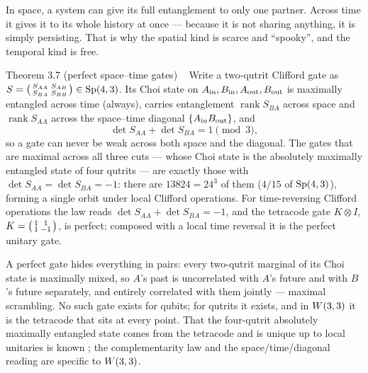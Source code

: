 \begin{plainwords}
In space, a system can give its full entanglement to only one partner. Across time it gives it to its whole history at
once --- because it is not sharing anything, it is simply persisting. That is why the spatial kind is scarce and
``spooky'', and the temporal kind is free.
\end{plainwords}

\begin{result}{Theorem 3.7 (perfect space--time gates) \hfill \tierT\ \tierC}
Write a two-qutrit Clifford gate as $S=\begin{psmallmatrix}S_{AA}&S_{AB}\\S_{BA}&S_{BB}\end{psmallmatrix}\in\mathrm{Sp}(4,3)$.
Its Choi state on $A_{\rm in},B_{\rm in},A_{\rm out},B_{\rm out}$ is maximally entangled across time (always), carries
entanglement $\operatorname{rank}S_{BA}$ across space and $\operatorname{rank}S_{AA}$ across the space--time diagonal
$\{A_{\rm in}B_{\rm out}\}$, and
\[
\det S_{AA}+\det S_{BA}=1 \pmod 3 ,
\]
so a gate can never be weak across both space and the diagonal. The gates that are maximal across all three cuts ---
whose Choi state is the absolutely maximally entangled state of four qutrits --- are exactly those with
$\det S_{AA}=\det S_{BA}=-1$: there are $13824=24^3$ of them ($4/15$ of $\mathrm{Sp}(4,3)$), forming a single orbit under local
Clifford operations. For time-reversing Clifford operations the law reads $\det S_{AA}+\det S_{BA}=-1$, and the
tetracode gate $K\otimes I$, $K=\begin{psmallmatrix}1&1\\1&-1\end{psmallmatrix}$, is perfect; composed with a local time
reversal it is the perfect unitary gate.
\end{result}

\begin{physical}
A perfect gate hides everything in pairs: every two-qutrit marginal of its Choi state is maximally mixed, so $A$'s past
is uncorrelated with $A$'s future and with $B$'s future separately, and entirely correlated with them jointly --- maximal
scrambling. No such gate exists for qubits; for qutrits it exists, and in $W(3,3)$ it is the tetracode that sits at every
point. That the four-qutrit absolutely maximally entangled state comes from the tetracode and is unique up to local
unitaries is known \cite{Tan2026}; the complementarity law and the space/time/diagonal reading are specific to $W(3,3)$.
\end{physical}


